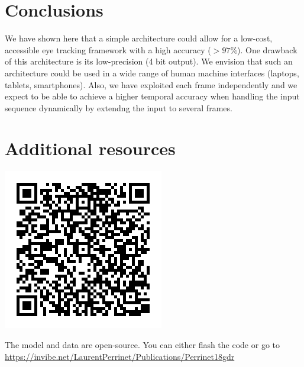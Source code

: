\documentclass[a0,portrait]{a0poster}
\begin{document}
\begin{multicols}{3} %
\color{Navy} %

\section*{Conclusions}
We have shown here that a simple architecture could allow for a low-cost, accessible eye tracking framework with a high accuracy ($>97\%$). One drawback of this architecture is its low-precision (4 bit output). We envision that such an architecture could be used in a wide range of human machine interfaces (laptops, tablets, smartphones). Also, we have exploited each frame independently and we expect to be able to achieve a higher temporal accuracy when handling the input sequence dynamically by extendng the input to several frames.

\color{Black} %

\section*{Additional resources}

\begin{minipage}{0.3\linewidth}
\includegraphics[width=1.\linewidth]{GitQR.png}
\end{minipage}\hfil
\begin{minipage}{0.67\linewidth}
The model and data are open-source. You can either flash the code or go to \url{https://invibe.net/LaurentPerrinet/Publications/Perrinet18gdr}
\end{minipage}

\end{multicols}
\end{document}
